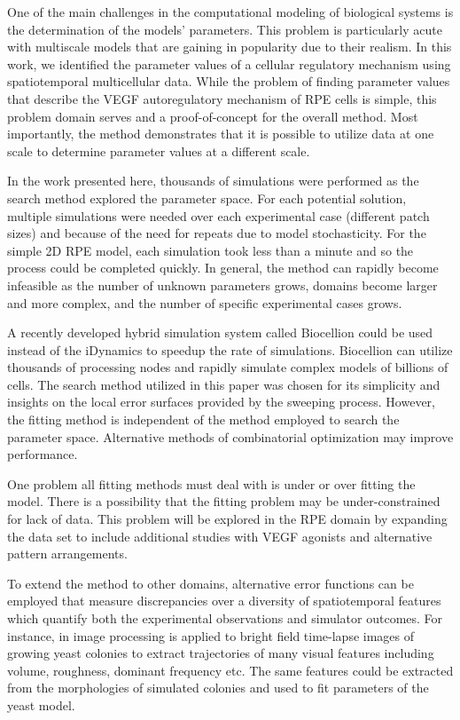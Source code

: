 
One of the main challenges in the computational modeling of biological systems is the determination of the models' parameters. This problem is particularly acute with multiscale models that are gaining in popularity due to their realism. In this work, we identified the parameter values of a cellular regulatory mechanism using spatiotemporal multicellular data. While the problem of finding parameter values that describe the VEGF autoregulatory mechanism of RPE cells is simple, this problem domain serves and a proof-of-concept for the overall method. Most importantly, the method demonstrates that it is possible to utilize data at one scale to determine parameter values at a different scale.

In the work presented here, thousands of simulations were performed as the search method explored the parameter space. For each potential solution, multiple simulations were needed over each experimental case (different patch sizes) and because of the need for repeats due to model stochasticity. For the simple 2D RPE model, each simulation took less than a minute and so the process could be completed quickly. In general, the method can rapidly become infeasible as the number of unknown parameters grows, domains become larger and more complex, and the number of specific experimental cases grows.

A recently developed hybrid simulation system called Biocellion \cite{Kang2014Biocellion} could be used instead of the iDynamics to speedup the rate of simulations. Biocellion can utilize thousands of processing nodes and rapidly simulate complex models of billions of cells. The search method utilized in this paper was chosen for its simplicity and insights on the local error surfaces provided by the sweeping process. However, the fitting method is independent of the method employed to search the parameter space. Alternative methods of combinatorial optimization may improve performance.

One problem all fitting methods must deal with is under or over fitting the model. There is a possibility that the fitting problem may be under-constrained for lack of data. This problem will be explored in the RPE domain by expanding the data set to include additional studies with VEGF agonists and alternative pattern arrangements.
 
To extend the method to other domains, alternative error functions can be employed that measure discrepancies over a diversity of spatiotemporal features which quantify both the experimental observations and simulator outcomes. For instance, in \cite{Ruusuvuori2014Quantitative} image processing is applied to bright field time-lapse images of growing yeast colonies to extract trajectories of many visual features including volume, roughness, dominant frequency etc. The same features could be extracted from the morphologies of simulated colonies and used to fit parameters of the yeast model.

